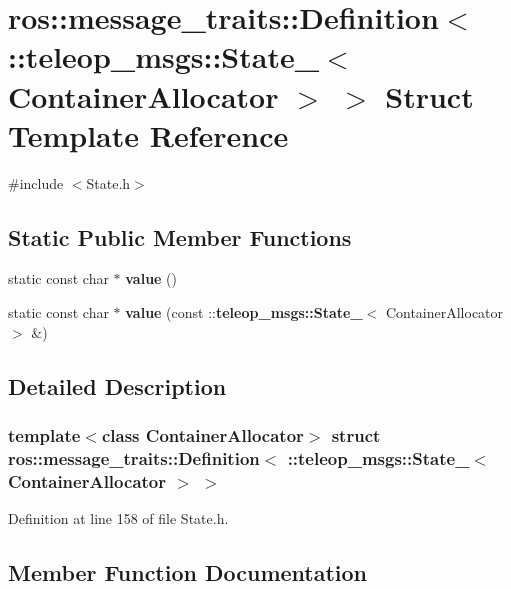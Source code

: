 \section{ros::message\_\-traits::Definition$<$ ::teleop\_\-msgs::State\_\-$<$ ContainerAllocator $>$ $>$ Struct Template Reference}
\label{structros_1_1message__traits_1_1Definition_3_01_1_1teleop__msgs_1_1State___3_01ContainerAllocator_01_4_01_4}


{\ttfamily \#include $<$State.h$>$}

\subsection*{Static Public Member Functions}
\begin{DoxyCompactItemize}
\item 
static const char $\ast$ {\bf value} ()
\item 
static const char $\ast$ {\bf value} (const ::{\bf teleop\_\-msgs::State\_\-}$<$ ContainerAllocator $>$ \&)
\end{DoxyCompactItemize}


\subsection{Detailed Description}
\subsubsection*{template$<$class ContainerAllocator$>$ struct ros::message\_\-traits::Definition$<$ ::teleop\_\-msgs::State\_\-$<$ ContainerAllocator $>$ $>$}



Definition at line 158 of file State.h.



\subsection{Member Function Documentation}
